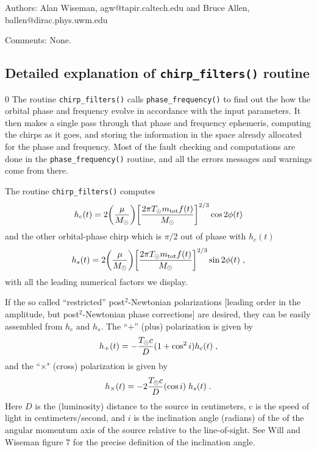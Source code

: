\begin{description}
\item{Authors:} Alan Wiseman, agw@tapir.caltech.edu and Bruce Allen, ballen@dirac.phys.uwm.edu
\item{Comments:}
None.
\end{description}
\clearpage

\subsection{Detailed explanation of {\tt chirp\_filters()} routine}
\setcounter{equation}0
The routine {\tt chirp\_filters()} calls {\tt phase\_frequency()} to find out the
how the orbital phase and frequency evolve in accordance with the 
input parameters. 
It then makes a single pass
through that phase and frequency ephemeris, computing the chirps as it goes,
and storing the information in the space already allocated
for the phase and frequency.
Most of the fault checking and computations are
done in the {\tt phase\_frequency()} routine,
and all the errors messages and warnings come from there.

The routine {\tt chirp\_filters()} computes
\begin{equation}
\label{e:chirpcos}
h_c(t) = 2 \biggl ({\mu \over M_\odot} \biggr )
\biggl [ { 2 \pi T_\odot m_{\rm tot} f(t) \over M_\odot  } \biggr ]^{2/3} 
\cos 2 \phi (t)
\end{equation}
and the other orbital-phase chirp which is $\pi/2$ out of phase with $h_c (t)$
\begin{equation}
\label{e:chirpsin}
h_s(t) = 2 \biggr ( {\mu \over M_\odot} \biggr )
\biggl [ { 2 \pi T_\odot m_{\rm tot} f(t) \over M_\odot  } \biggr ]
^{2/3} \sin 2 \phi (t) \; ,
\end{equation}
with all the leading numerical factors we display.

If the so called ``restricted'' post$^2$-Newtonian polarizations 
[leading order in the amplitude, but post$^2$-Newtonian phase corrections]
are desired, they can be easily  assembled from $h_c$ and $h_s$.
The ``$+$'' (plus) polarization is given by
\begin{equation}
h_{+}(t) = - { T_\odot c \over D} (1+\cos^2 i ) h_c(t) \; ,
\end{equation}
and the ``$\times$" (cross) polarization is given by
\begin{equation}
h_\times (t) = -2  { T_\odot c \over D} ( \cos i ) \; h_s(t) \; .
\end{equation}
Here $D$ is the (luminosity) distance to the source in centimeters,
c is the speed of light in centimeters/second,
and $i$ is the inclination angle (radians) of the of the angular momentum
axis of the source relative to the line-of-sight.  
See Will and Wiseman \cite{willwiseman} figure 7 for the precise definition
of the inclination angle.

